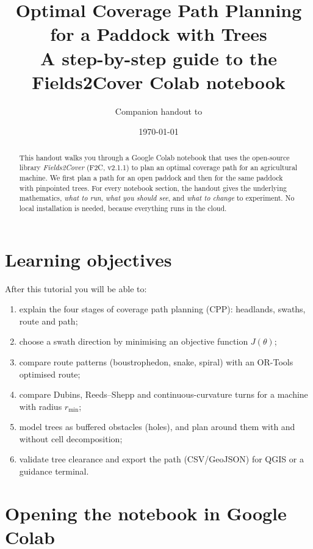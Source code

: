\documentclass[11pt,a4paper]{article}
\title{\textbf{Optimal Coverage Path Planning for a Paddock with Trees}\\[4pt]
  \large A step-by-step guide to the Fields2Cover Colab notebook}
\author{Companion handout to \code{Fields2Cover\_Paddock\_Trees.ipynb}}
\date{\today}
\begin{document}
\maketitle

\begin{abstract}
\noindent This handout walks you through a Google Colab notebook that uses the open-source library
\emph{Fields2Cover} (F2C, v2.1.1) to plan an optimal coverage path for an agricultural machine.
We first plan a path for an open paddock and then for the same paddock with pinpointed trees.
For every notebook section, the handout gives the underlying mathematics, \emph{what to run},
\emph{what you should see}, and \emph{what to change} to experiment.
No local installation is needed, because everything runs in the cloud.
\end{abstract}

\tableofcontents
\bigskip

\section{Learning objectives}
After this tutorial you will be able to:
\begin{enumerate}[nosep]
  \item explain the four stages of coverage path planning (CPP): headlands, swaths, route and path;
  \item choose a swath direction by minimising an objective function $J(\theta)$;
  \item compare route patterns (boustrophedon, snake, spiral) with an OR-Tools optimised route;
  \item compare Dubins, Reeds--Shepp and continuous-curvature turns for a machine with radius $r_{\min}$;
  \item model trees as buffered obstacles (holes), and plan around them with and without cell decomposition;
  \item validate tree clearance and export the path (CSV/GeoJSON) for QGIS or a guidance terminal.
\end{enumerate}

\section{Opening the notebook in Google Colab}\label{sec:colab}
\end{document}
